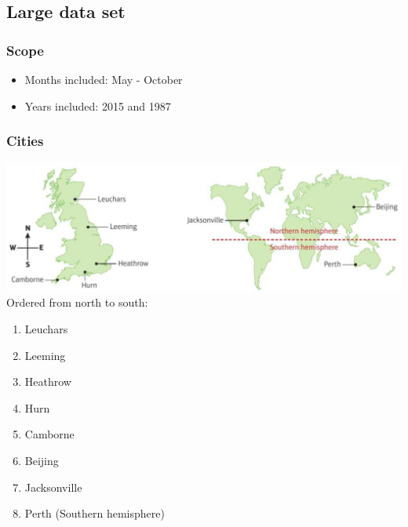 \documentclass[A4paper, 11pt]{article}
\begin{document}
	
	\subsection{Large data set}
	\subsubsection{Scope}
	\begin{itemize}
		\item Months included: May - October
		\item Years included: 2015 and 1987
	\end{itemize}
	\subsubsection{Cities}
	\includegraphics{LDSmap}\\
	Ordered from north to south:
	\begin{enumerate}
		\item Leuchars
		\item Leeming
		\item Heathrow
		\item Hurn
		\item Camborne
		\item Beijing
		\item Jacksonville
		\item Perth (Southern hemisphere)
	\end{enumerate}
	
\end{document}
